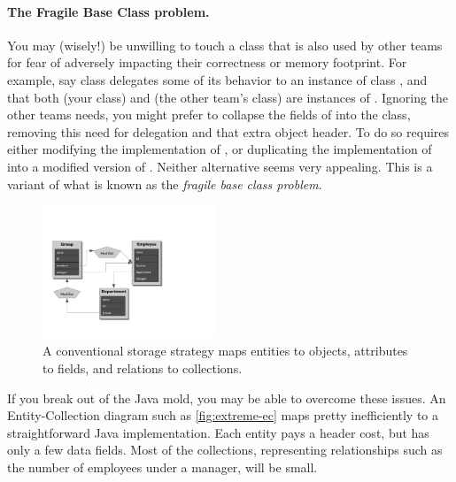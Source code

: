 \paragraph{The Fragile Base Class problem.}
You may (wisely!) be unwilling to touch a class that is also used by other
 teams for fear of adversely impacting their correctness or
 memory footprint. For example, say class  delegates some of its
 behavior to an instance of class , and that both  (your
 class) and  (the other team's class) are instances of .
 Ignoring the other teams needs, you might prefer to collapse the fields of
  into the  class, removing this need for delegation and that
 extra object header. To do so requires either modifying the implementation of
 , or duplicating the implementation of  into a modified version of . Neither alternative seems very appealing.
 This is a variant of what is known as the \emph{fragile base class problem}.

\begin{figure}
\centering
   \includegraphics[width=0.46\textwidth]{part3/Figures/extreme/EC-example-for-columns1}
   \caption{A conventional storage strategy maps entities to objects, 
   attributes to fields, and relations to collections.}
   \label{fig:extreme-ec}
\end{figure}
If you break out of the Java mold, you may be able to overcome these issues. An
Entity-Collection diagram such as \autoref{fig:extreme-ec} maps pretty
inefficiently to a straightforward Java implementation. Each entity pays a
header cost, but has only a few data fields. Most of the collections,
representing relationships such as the number of employees under a manager, will
be small. 

